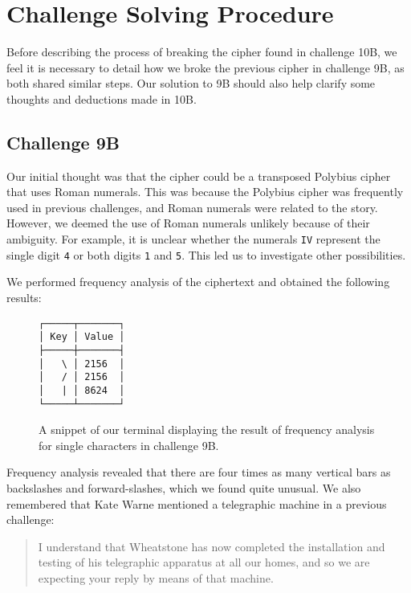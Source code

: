 \section*{Challenge Solving Procedure}

Before describing the process of breaking the cipher found in challenge 10B, we feel it is necessary to detail how we broke the previous cipher in challenge 9B, as both shared similar steps. Our solution to 9B should also help clarify some thoughts and deductions made in 10B.

\subsection*{Challenge 9B}

Our initial thought was that the cipher could be a transposed Polybius cipher that uses Roman numerals. This was because the Polybius cipher was frequently used in previous challenges, and Roman numerals were related to the story. However, we deemed the use of Roman numerals unlikely because of their ambiguity. For example, it is unclear whether the numerals \texttt{IV} represent the single digit \texttt{4} or both digits \texttt{1} and \texttt{5}. This led us to investigate other possibilities.

We performed frequency analysis of the ciphertext and obtained the following results:

\begin{figure}[H]
\centering
\begin{minipage}{15ex}
\begin{verbatim}        
┌─────┬───────┐
│ Key │ Value │
├─────┼───────┤
│   \ │ 2156  │
│   / │ 2156  │
│   | │ 8624  │
└─────┴───────┘      
\end{verbatim}
\end{minipage}
\label{fig:char_count_9b}
\caption{A snippet of our terminal displaying the result of frequency analysis for single characters in challenge 9B.}
\end{figure}

Frequency analysis revealed that there are four times as many vertical bars as backslashes and forward-slashes, which we found quite unusual. We also remembered that Kate Warne mentioned a telegraphic machine in a previous challenge:

\begin{quote}\ttfamily
I understand that Wheatstone has now completed the installation and testing of his telegraphic apparatus at all our homes, and so we are expecting your reply by means of that machine.    
\end{quote}

